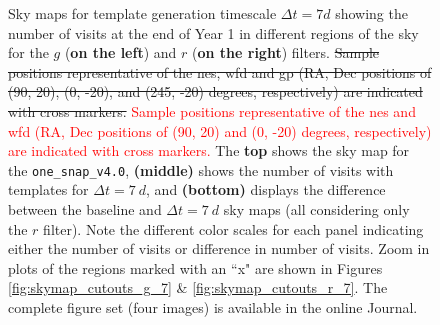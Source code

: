 \documentclass[preprintm,linenumbers]{aastex631}
\newcommand{\baseline}{\texttt{one\_snap\_v4.0}\xspace}
\providecommand{\red}[1]{\textcolor{red}{#1}}
\begin{document}
\begin{figure}
        \caption{Sky maps for template generation timescale $\Delta t = 7 \si{d}$ showing the number of visits at the end of Year 1 in different regions of the sky for the $g$ (\textbf{on the left}) and  $r$ (\textbf{on the right}) filters. 
        \sout{Sample positions representative of the \gls*{nes}, \gls*{wfd} and \gls*{gp} (RA, Dec positions of (90, 20), (0, -20), and (245, -20) degrees, respectively) are indicated with cross markers.} 
        \red{Sample positions representative of the \gls*{nes} and \gls*{wfd} (RA, Dec positions of (90, 20) and (0, -20) degrees, respectively) are indicated with cross markers.}
        The \textbf{top} shows the sky map for the \baseline, \textbf{(middle)} shows the number of visits with templates for $\Delta t = 7\ \si{d}$, and \textbf{(bottom)} displays the difference between the baseline and $\Delta t = 7\ \si{d}$ sky maps (all considering only the $r$ filter). Note the different color scales for each panel indicating either the number of visits or difference in number of visits. 
        Zoom in plots of the regions marked with an ``x" are shown in Figures \ref{fig:skymap_cutouts_g_7} \& \ref{fig:skymap_cutouts_r_7}. 
        The complete figure set (four images) is available in the online Journal. 
        }
        \label{fig:all_together_r_7d}
	\end{figure}

  
\end{document}
